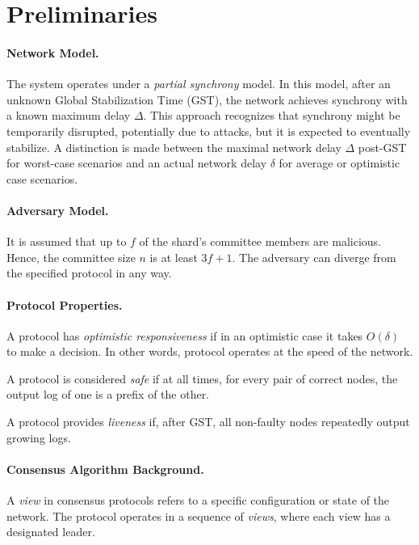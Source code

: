 \section{Preliminaries}
\label{section:preliminaries}

\paragraph{Network Model.}
The system operates under a \textit{partial synchrony} model.
In this model, after an unknown Global Stabilization Time (GST), 
 the network achieves synchrony with a known maximum delay $\Delta$.
This approach recognizes that synchrony might be temporarily disrupted, 
 potentially due to attacks, but it is expected to eventually stabilize. 
 A distinction is made between the maximal network delay $\Delta$ post-GST 
  for worst-case scenarios and an actual network delay $\delta$ 
  for average or optimistic case scenarios.

\paragraph{Adversary Model.}
It is assumed that up to $f$ of the shard's committee members are malicious.
Hence, the committee size $n$ is at least $3f+1$.
The adversary can diverge from the specified protocol in any way.

\paragraph{Protocol Properties.}
A protocol has \emph{optimistic responsiveness} if in an optimistic case it takes 
 $O(\delta)$ to make a decision.
In other words, protocol operates at the speed of the network.

A protocol is considered \emph{safe} if at all times, for every pair of correct nodes, 
 the output log of one is a prefix of the other.

A protocol provides \emph{liveness} if, after GST, all non-faulty nodes repeatedly output growing logs.

\paragraph{Consensus Algorithm Background.}

A \emph{view} in consensus protocols refers to a specific configuration 
 or state of the network.
The protocol operates in a sequence of \emph{views}, 
 where each view has a designated leader.

